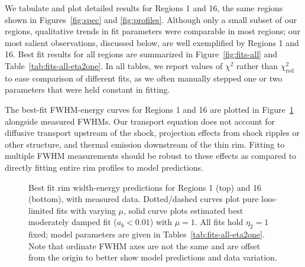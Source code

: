 \documentclass[iop, apj, numberedappendix]{emulateapj}
\newcommand*{\mt}{\mathrm}
\begin{document}
We tabulate and plot detailed results for Regions 1 and 16, the same regions
shown in Figures~\ref{fig:spec} and \ref{fig:profiles}.  Although only a small
subset of our regions, qualitative trends in fit parameters were comparable in
most regions; our most salient observations, discussed below, are well
exemplified by Regions 1 and 16.  Best fit results for all regions are
summarized in Figure~\ref{fig:fits-all} and Table~\ref{tab:fits-all-eta2one}.
In all tables, we report values of $\chi^2$ rather
than $\chi^2_\mt{red}$ to ease comparison of different fits, as we often
manually stepped one or two parameters that were held constant in fitting.

The best-fit FWHM-energy curves for Regions 1 and 16 are plotted in
Figure~\ref{fig:fits} alongside measured FWHMs.
Our transport equation does not account for
diffusive transport upstream of the shock, projection effects from shock
ripples or other structure, and thermal emission downstream of the thin rim.
Fitting to multiple FWHM measurements should be robust to these effects as
compared to directly fitting entire rim profiles to model predictions.

\begin{figure}
    \centering
    \iftoggle{manuscript}{
        \texttt{[image: figures/energywidth-eta2one-01.pdf]}
        \texttt{[image: figures/energywidth-eta2one-16.pdf]}
    }{
        \texttt{[image: figures/energywidth-eta2one-01.pdf]}
        \texttt{[image: figures/energywidth-eta2one-16.pdf]}
    }
    \caption{Best fit rim width-energy predictions for
    Regions 1 (top) and 16 (bottom), with measured data.  Dotted/dashed curves
    plot pure loss-limited fits with varying $\mu$, solid curve plots estimated
    best moderately damped fit ($a_b < 0.01$) with $\mu = 1$.  All fits hold
    $\eta_2 = 1$ fixed; model parameters are given in
    Tables~\ref{tab:fits-all-eta2one}.
    Note that ordinate FWHM axes are not the same and are offset from the
    origin to better show model predictions and data variation.
    \label{fig:fits}}
\end{figure}
\end{document}
